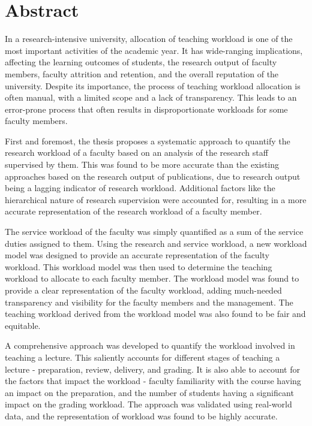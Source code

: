 
\chapter*{Abstract}

In a research-intensive university, allocation of teaching workload is one of the most important activities of the academic year. It has wide-ranging implications, affecting the learning outcomes of students, the research output of faculty members, faculty attrition and retention, and the overall reputation of the university. Despite its importance, the process of teaching workload allocation is often manual, with a limited scope and a lack of transparency. This leads to an error-prone process that often results in disproportionate workloads for some faculty members.

First and foremost, the thesis proposes a systematic approach to quantify the research workload of a faculty based on an analysis of the research staff supervised by them. This was found to be more accurate than the existing approaches based on the research output of publications, due to research output being a lagging indicator of research workload. Additional factors like the hierarchical nature of research supervision were accounted for, resulting in a more accurate representation of the research workload of a faculty member.

The service workload of the faculty was simply quantified as a sum of the service duties assigned to them. Using the research and service workload, a new workload model was designed to provide an accurate representation of the faculty workload. This workload model was then used to determine the teaching workload to allocate to each faculty member. The workload model was found to provide a clear representation of the faculty workload, adding much-needed transparency and visibility for the faculty members and the management. The teaching workload derived from the workload model was also found to be fair and equitable.

A comprehensive approach was developed to quantify the workload involved in teaching a lecture. This saliently accounts for different stages of teaching a lecture - preparation, review, delivery, and grading. It is also able to account for the factors that impact the workload - faculty familiarity with the course having an impact on the preparation, and the number of students having a significant impact on the grading workload. The approach was validated using real-world data, and the representation of workload was found to be highly accurate.

